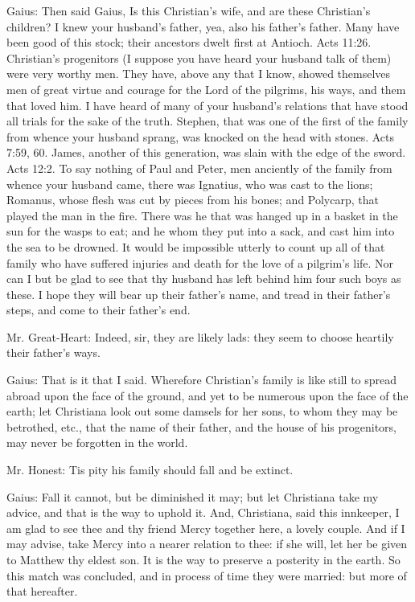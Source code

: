Gaius: Then said Gaius, Is this Christian's wife, and are these Christian's children? I knew your husband's father, yea, also his father's father. Many have been good of this stock; their ancestors dwelt first at Antioch. Acts 11:26. Christian's progenitors (I suppose you have heard your husband talk of them) were very worthy men. They have, above any that I know, showed themselves men of great virtue and courage for the Lord of the pilgrims, his ways, and them that loved him. I have heard of many of your husband's relations that have stood all trials for the sake of the truth. Stephen, that was one of the first of the family from whence your husband sprang, was knocked on the head with stones. Acts 7:59, 60. James, another of this generation, was slain with the edge of the sword. Acts 12:2. To say nothing of Paul and Peter, men anciently of the family from whence your husband came, there was Ignatius, who was cast to the lions; Romanus, whose flesh was cut by pieces from his bones; and Polycarp, that played the man in the fire. There was he that was hanged up in a basket in the sun for the wasps to eat; and he whom they put into a sack, and cast him into the sea to be drowned. It would be impossible utterly to count up all of that family who have suffered injuries and death for the love of a pilgrim's life. Nor can I but be glad to see that thy husband has left behind him four such boys as these. I hope they will bear up their father's name, and tread in their father's steps, and come to their father's end.

Mr. Great-Heart: Indeed, sir, they are likely lads: they seem to choose heartily their father's ways.

Gaius: That is it that I said. Wherefore Christian's family is like still to spread abroad upon the face of the ground, and yet to be numerous upon the face of the earth; let Christiana look out some damsels for her sons, to whom they may be betrothed, etc., that the name of their father, and the house of his progenitors, may never be forgotten in the world.

Mr. Honest: Tis pity his family should fall and be extinct.

Gaius: Fall it cannot, but be diminished it may; but let Christiana take my advice, and that is the way to uphold it. And, Christiana, said this innkeeper, I am glad to see thee and thy friend Mercy together here, a lovely couple. And if I may advise, take Mercy into a nearer relation to thee: if she will, let her be given to Matthew thy eldest son. It is the way to preserve a posterity in the earth. So this match was concluded, and in process of time they were married: but more of that hereafter.

